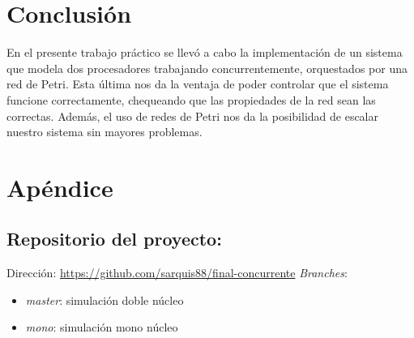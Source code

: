 \documentclass{article}
\begin{document}
    \section{Conclusión}
    En el presente trabajo práctico se llevó a cabo la implementación de un sistema que modela
    dos procesadores trabajando concurrentemente, orquestados por una red de Petri. Esta última
    nos da la ventaja de poder controlar que el sistema funcione correctamente, chequeando que
    las propiedades de la red sean las correctas. Además, el uso de redes de Petri nos da la 
    posibilidad de escalar nuestro sistema sin mayores problemas.
    \newpage 
    \section{Apéndice}
    \subsection{Repositorio del proyecto:} \noindent
    Dirección: \url{https://github.com/sarquis88/final-concurrente} \newline \newline
    \emph{Branches}: 
    \begin{itemize}
        \item \emph{master}: simulación doble núcleo
        \item \emph{mono}: simulación mono núcleo
    \end{itemize}
\end{document}
